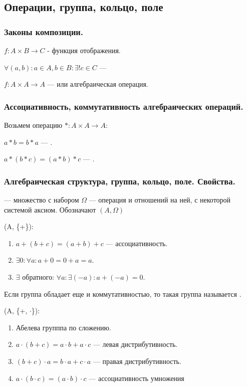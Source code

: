 \subsection{Операции, группа, кольцо, поле}
\subsubsection{Законы композиции.}

$f: A \times B \rightarrow C$ - функция отображения.

$\forall (a,b): a \in A, b \in B: \exists! c \in C$ --- 

$f: A \times A \rightarrow A$ ---  или алгебраическая операция.

\subsubsection{Ассоциативность, коммутативность алгебраических операций.}

Возьмем операцию $*: A \times A \rightarrow A$:

$a * b = b * a$ --- .

$a * (b *c) = (a * b) *c$ --- .


\subsubsection{Алгебраическая структура, группа, кольцо, поле. Свойства.}

 --- множество с набором $\Omega$ --- операция и отношений на ней, с некоторой системой аксиом. Обозначают $(A, \Omega)$

 (A, \{+\}):

\begin{enumerate}
    \item $a+(b+c) = (a+b)+c$ --- ассоциативность.
    \item $\exists 0:\forall a: a + 0 = 0+ a =a$.
    \item $\exists$  обратного: $\forall a: \exists (-a): a+ (-a) = 0$.
\end{enumerate}

Если группа обладает еще и коммутативностью, то такая группа называется .

 (A, \{+, $\cdot$\}):

\begin{enumerate}
    \item Абелева групппа по сложению.
    \item $a \cdot (b+c) = a\cdot b + a\cdot c$ --- левая дистрибутивность.
    \item $(b+c)\cdot a  = b \cdot a + c \cdot a$  --- правая дистрибутивность.
    \item $a \cdot (b\cdot c) = (a\cdot b)\cdot c$ --- ассоциативность умножения
\end{enumerate}

